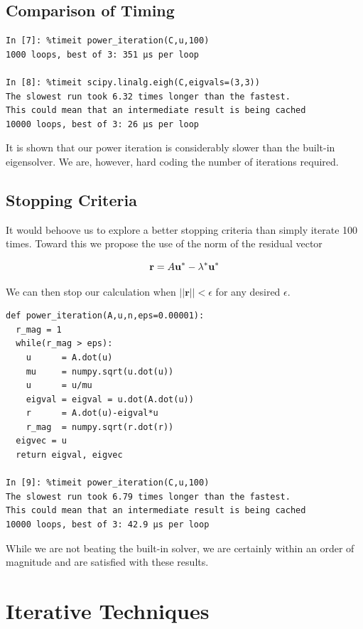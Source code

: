 \documentclass[12pt,]{book}
\newcommand{\R}{\mathbb{R}}
\begin{document}
\subsection{Comparison of Timing}\label{comparison-of-timing-1}

\begin{verbatim}
In [7]: %timeit power_iteration(C,u,100)
1000 loops, best of 3: 351 µs per loop

In [8]: %timeit scipy.linalg.eigh(C,eigvals=(3,3))
The slowest run took 6.32 times longer than the fastest. 
This could mean that an intermediate result is being cached
10000 loops, best of 3: 26 µs per loop
\end{verbatim}

It is shown that our power iteration is considerably slower than the
built-in eigensolver. We are, however, hard coding the number of
iterations required.

\subsection{Stopping Criteria}\label{stopping-criteria}

It would behoove us to explore a better stopping criteria than simply
iterate 100 times. Toward this we propose the use of the norm of the
residual vector

\[\mathbf{r}=A\mathbf{u}^*-\lambda^*\mathbf{u}^*\]

We can then stop our calculation when
\(\rvert\rvert\mathbf r \rvert\rvert<\epsilon\) for any desired
\(\epsilon\).

\begin{verbatim}
def power_iteration(A,u,n,eps=0.00001):
  r_mag = 1
  while(r_mag > eps):
    u      = A.dot(u)
    mu     = numpy.sqrt(u.dot(u))
    u      = u/mu
    eigval = eigval = u.dot(A.dot(u))
    r      = A.dot(u)-eigval*u
    r_mag  = numpy.sqrt(r.dot(r))
  eigvec = u
  return eigval, eigvec

In [9]: %timeit power_iteration(C,u,100)
The slowest run took 6.79 times longer than the fastest. 
This could mean that an intermediate result is being cached
10000 loops, best of 3: 42.9 µs per loop
\end{verbatim}

While we are not beating the built-in solver, we are certainly within an
order of magnitude and are satisfied with these results.

\newcommand{\R}{\mathbb{R}}

\section{Iterative Techniques}\label{iterative-techniques}
\end{document}
